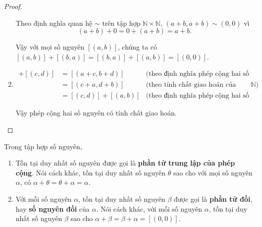 \begin{proof}
\begin{enumerate}[label={(\roman*)}]
		      Theo định nghĩa quan hệ $\sim$ trên tập hợp $\mathbb{N}\times\mathbb{N}$, $(a+b, a+b)\sim (0, 0)$ vì
		      \[
			      (a+b) + 0 = 0 + (a+b) = a+b.
		      \]

		      Vậy với mọi số nguyên $[(a, b)]$, chúng ta có $[(a, b)] + [(b, a)] = [(b, a)] + [(a, b)] = [(0, 0)]$.
		\item \begin{align*}
			      [(a, b)] + [(c, d)] & = [(a+c, b+d)]        & \text{(theo định nghĩa phép cộng hai số nguyên)}                  \\
			                          & = [(c+a, d+b)]        & \text{(theo tính chất giao hoán của phép cộng trên $\mathbb{N}$)} \\
			                          & = [(c, d)] + [(a, b)] & \text{(theo định nghĩa phép cộng hai số nguyên)}
		      \end{align*}

		      Vậy phép cộng hai số nguyên có tính chất giao hoán.
	\end{enumerate}
\end{proof}

\begin{theorem}\label{theorem:uniqueness-of-additive-identity-and-additive-inverse}
	Trong tập hợp số nguyên,
	\begin{enumerate}[label={(\roman*)}]
		\item Tồn tại duy nhất số nguyên được gọi là \textbf{phần tử trung lập của phép cộng}. Nói cách khác, tồn tại duy nhất số nguyên $\theta$ sao cho với mọi số nguyên $\alpha$, có $\alpha + \theta = \theta + \alpha = \alpha$.
		\item Với mỗi số nguyên $\alpha$, tồn tại duy nhất số nguyên $\beta$ được gọi là \textbf{phần tử đối}, hay \textbf{số nguyên đối} của $\alpha$. Nói cách khác, với mỗi số nguyên $\alpha$, tồn tại duy nhất số nguyên $\beta$ sao cho $\alpha + \beta = \beta + \alpha = [(0,0)]$.
	\end{enumerate}
\end{theorem}


